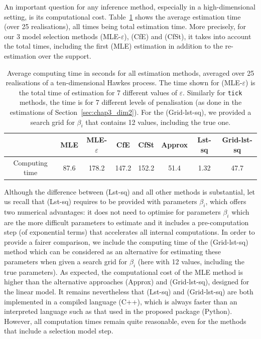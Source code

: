 An important question for any inference method, especially in a high-dimensional setting, is its computational cost. Table~\ref{tab:chap3_times_10} shows the average estimation time (over 25 realisations), all times being total estimation time. More precisely, for our 3 model selection methods (MLE-$\varepsilon$), (CfE) and (CfSt), it takes into account the total times, including the first (MLE) estimation in addition to the re-estimation over the support. 

\begin{table}[!ht] 
    \begin{center}
    \setlength{\tabcolsep}{2pt}
    \centering
    \begin{tabular}{c|c|ccc|c|cc}
          & MLE & MLE-$\varepsilon$ & CfE & CfSt & Approx & Lst-sq & Grid-lst-sq\\
         \toprule
         Computing time & 87.6 & 178.2 & 147.2 & 152.2 & 51.4 & 1.32 & 47.7
    \end{tabular}
    \caption{Average computing time in seconds for all estimation methods, averaged over 25 realisations of a ten-dimensional Hawkes process.  The time shown for (MLE-$\varepsilon$) is the total time of estimation for 7 different values of $\varepsilon$. Similarly for \texttt{tick} methods, the time is for 7 different levels of penalisation (as done in the estimations of Section~\ref{sec:chap3_dim2}). For the (Grid-lst-sq), we provided a search grid for $\beta_i$ that contains 12 values, including the true one.}
    \label{tab:chap3_times_10}
    \end{center}
    \end{table}

Although the difference between (Lst-sq) and all other methods is substantial, let us recall that (Lst-sq) requires to be provided with parameters $\beta_i$, which offers two numerical advantages: it does not need to optimise for parameters $\beta_i$ which are the more difficult parameters to estimate and it includes a pre-computation step (of exponential terms) that accelerates all internal computations. In order to provide a fairer comparison, we include the computing time of the (Grid-lst-sq) method which can be considered as an alternative for estimating these parameters when given a search grid for $\beta_i$ (here with 12 values, including the true parameters).
As expected, the computational cost of the MLE method is higher than the alternative approaches (Approx) and (Grid-lst-sq), designed for the linear model.
It remains nevertheless that (Lst-sq) and (Grid-lst-sq) are both implemented in a compiled language (C++), which is always faster than an interpreted language such as that used in the proposed package (Python).
However, all computation times remain quite reasonable, even for the methods that include a selection model step. 

